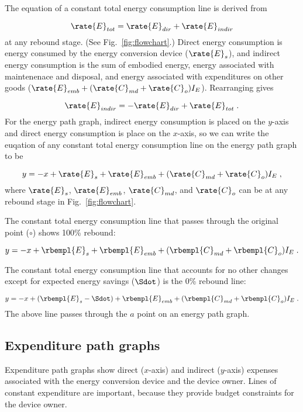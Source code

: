 The equation of a constant total energy consumption line is derived from 

\begin{equation}
  \rate{E}_{tot} = \rate{E}_{dir} + \rate{E}_{indir}
\end{equation}
%
at any rebound stage. (See Fig.~\ref{fig:flowchart}.)
Direct energy consumption is energy consumed by the energy conversion device
($\rate{E}_s$), and 
indirect energy consumption is the sum of embodied energy, 
energy associated with maintenenace and disposal, and energy associated 
with expenditures on other goods
($\rate{E}_{emb} + (\rate{C}_{md} + \rate{C}_o) I_E$).
Rearranging gives

\begin{equation}
  \rate{E}_{indir} = - \rate{E}_{dir} + \rate{E}_{tot} \; .
\end{equation}
%
For the energy path graph, 
indirect energy consumption is placed on the $y$-axis
and direct energy consumption is place on the $x$-axis, 
so we can write the euqation of any 
constant total energy consumption line on the energy path graph to be

\begin{equation}
  y = -x + \rate{E}_s + \rate{E}_{emb} + (\rate{C}_{md} + \rate{C}_o) I_E \; ,
\end{equation}
%
where $\rate{E}_s$, $\rate{E}_{emb}$, $\rate{C}_{md}$, and $\rate{C}_o$
can be at any rebound stage in Fig.~\ref{fig:flowchart}.

The constant total energy consumption line 
that passes through the original point ($\circ$)
shows 100\% rebound:

\begin{equation}
  y = -x + \rbempl{E}_s + \rbempl{E}_{emb} + (\rbempl{C}_{md} + \rbempl{C}_o) I_E \; .
\end{equation}

The constant total energy consumption line 
that accounts for no other changes 
except for expected energy savings ($\Sdot$)
is the 0\% rebound line:

\begin{equation}
  y = -x + (\rbempl{E}_s - \Sdot)
          + \rbempl{E}_{emb} + (\rbempl{C}_{md} + \rbempl{C}_o) I_E \; .
\end{equation}
%
The above line passes through the $a$ point on an energy path graph.


\subsection{Expenditure path graphs}
\label{sec:expenditure_path_graph_details}

Expenditure path graphs show direct ($x$-axis) and indirect ($y$-axis)
expenses associated with the energy conversion device 
and the device owner.
Lines of constant expenditure are important, 
because they provide budget constraints for the device owner.



